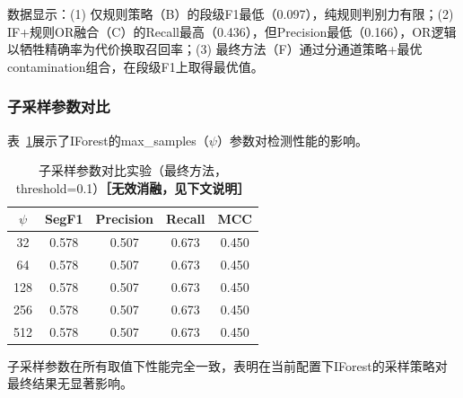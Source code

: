 \documentclass[12pt, a4paper]{article}
\begin{document}
数据显示：(1) 仅规则策略（B）的段级F1最低（0.097），纯规则判别力有限；(2) IF+规则OR融合（C）的Recall最高（0.436），但Precision最低（0.166），OR逻辑以牺牲精确率为代价换取召回率；(3) 最终方法（F）通过分通道策略+最优contamination组合，在段级F1上取得最优值。

\subsubsection{子采样参数对比}

表~\ref{tab:subsampling}展示了IForest的max\_samples（$\psi$）参数对检测性能的影响。

\begin{table}[H]
\centering
\caption{子采样参数对比实验（最终方法，threshold=0.1）\textbf{［无效消融，见下文说明］}}
\label{tab:subsampling}
\begin{tabular}{ccccc}
\toprule
$\psi$ & SegF1 & Precision & Recall & MCC \\
\midrule
32 & 0.578 & 0.507 & 0.673 & 0.450 \\
64 & 0.578 & 0.507 & 0.673 & 0.450 \\
128 & 0.578 & 0.507 & 0.673 & 0.450 \\
256 & 0.578 & 0.507 & 0.673 & 0.450 \\
512 & 0.578 & 0.507 & 0.673 & 0.450 \\
\bottomrule
\end{tabular}
\end{table}

子采样参数在所有取值下性能完全一致，表明在当前配置下IForest的采样策略对最终结果无显著影响。
\end{document}
